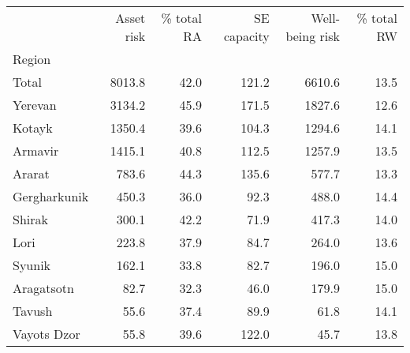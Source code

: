 \begin{tabular}{lrrrrr}
\toprule
{} &  Asset risk &  \% total RA &  SE capacity &  Well-being risk &  \% total RW \\
Region       &             &             &              &                  &             \\
\midrule
Total        &      8013.8 &        42.0 &        121.2 &           6610.6 &        13.5 \\
Yerevan      &      3134.2 &        45.9 &        171.5 &           1827.6 &        12.6 \\
Kotayk       &      1350.4 &        39.6 &        104.3 &           1294.6 &        14.1 \\
Armavir      &      1415.1 &        40.8 &        112.5 &           1257.9 &        13.5 \\
Ararat       &       783.6 &        44.3 &        135.6 &            577.7 &        13.3 \\
Gergharkunik &       450.3 &        36.0 &         92.3 &            488.0 &        14.4 \\
Shirak       &       300.1 &        42.2 &         71.9 &            417.3 &        14.0 \\
Lori         &       223.8 &        37.9 &         84.7 &            264.0 &        13.6 \\
Syunik       &       162.1 &        33.8 &         82.7 &            196.0 &        15.0 \\
Aragatsotn   &        82.7 &        32.3 &         46.0 &            179.9 &        15.0 \\
Tavush       &        55.6 &        37.4 &         89.9 &             61.8 &        14.1 \\
Vayots Dzor  &        55.8 &        39.6 &        122.0 &             45.7 &        13.8 \\
\bottomrule
\end{tabular}
